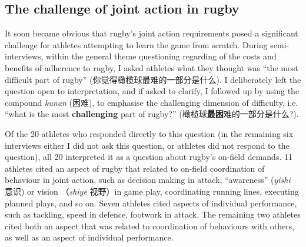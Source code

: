 \begin{CJK}{UTF8}{gbsn}


\subsection{The challenge of joint action in rugby}

It soon became obvious that rugby's joint action requirements posed a significant challenge for athletes attempting to learn the game from scratch.  During semi-interviews, within the general theme questioning regarding of the costs and benefits of adherence to rugby, I asked athletes what they thought was ``the most difficult part of rugby'' (你觉得橄榄球最难的一部分是什么).  I deliberately left the question open to interpretation, and if asked to clarify, I followed up by using the compound \textit{kunan} (困难), to emphasise the challenging dimension of difficulty, i.e. ``what is the most \textbf{challenging} part of rugby?'' (橄榄球\textbf{最困}难的一部分是什么?).

Of the 20 athletes who responded directly to this question (in the remaining six interviews either I did not ask this question, or athletes did not respond to the question), all 20 interpreted it as a question about rugby's on-field demands.  11 athletes cited an aspect of rugby that related to on-field coordination of behaviour in joint action, such as decision making in attack, ``awareness'' (\textit{yishi} 意识) or vision （\textit{shiye} 视野）in game play, coordinating running lines, executing planned plays, and so on.  Seven athletes cited aspects of individual performance, such as tackling, speed in defence, footwork in attack. The remaining two athletes cited both an aspect that was related to coordination of behaviours with others, as well as an aspect of individual performance.


\end{CJK}
